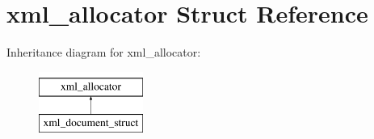 \hypertarget{structxml__allocator}{}\section{xml\+\_\+allocator Struct Reference}
\label{structxml__allocator}
Inheritance diagram for xml\+\_\+allocator\+:\begin{figure}[H]
\begin{center}
\leavevmode
\includegraphics[height=2.000000cm]{structxml__allocator}
\end{center}
\end{figure}
